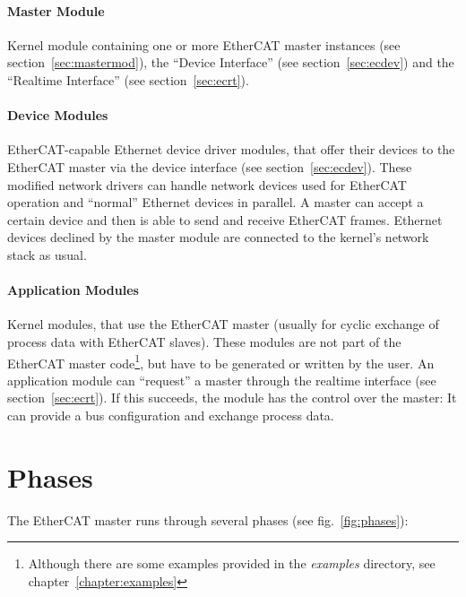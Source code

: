\documentclass[a4paper,12pt,BCOR6mm,bibtotoc,idxtotoc]{scrbook}
\begin{document}
\paragraph{Master Module}

Kernel module containing one or more EtherCAT master instances (see
section~\ref{sec:mastermod}), the ``Device Interface'' (see
section~\ref{sec:ecdev}) and the ``Realtime Interface'' (see
section~\ref{sec:ecrt}).

\paragraph{Device Modules}

EtherCAT-capable Ethernet device driver modules, that
offer their devices to the EtherCAT master via the device interface (see
section~\ref{sec:ecdev}). These modified network drivers can handle network
devices used for EtherCAT operation and ``normal'' Ethernet devices in
parallel. A master can accept a certain device and then is able to send and
receive EtherCAT frames. Ethernet devices declined by the master module are
connected to the kernel's network stack as usual.

\paragraph{Application Modules}

Kernel modules, that use the EtherCAT master (usually for cyclic exchange of
process data with EtherCAT slaves). These modules are not part of the EtherCAT
master code\footnote{Although there are some examples provided in the
\textit{examples} directory, see chapter~\ref{chapter:examples}}, but have to
be generated or written by the user. An application module can ``request'' a
master through the realtime interface (see section~\ref{sec:ecrt}). If this
succeeds, the module has the control over the master: It can provide a bus
configuration and exchange process data.


\section{Phases}

The EtherCAT master runs through several phases (see fig.~\ref{fig:phases}):
\end{document}
